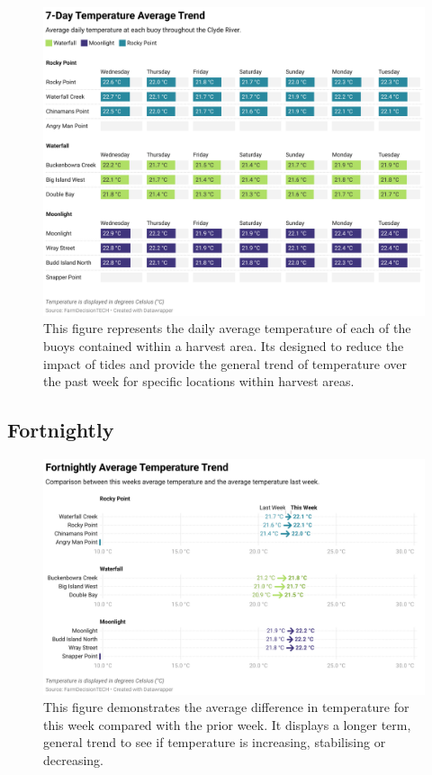 \documentclass[10pt]{article}
\begin{document}
\begin{figure}[H]
\centering
\includegraphics[width=\textwidth]{weekly-temperature.png}
\caption[Average Weekly Temperature Table]{This figure represents the daily average temperature of each of the buoys contained within a harvest area. Its designed to reduce the impact of tides and provide the general trend of temperature over the past week for specific locations within harvest areas.}
\end{figure}

\subsection{Fortnightly}

\begin{figure}[H]
\centering
\includegraphics[width=\textwidth]{fortnightly-temperature.png}
\caption[Average Fortnightly Temperature Difference]{This figure demonstrates the average difference in temperature for this week compared with the prior week. It displays a longer term, general trend to see if temperature is increasing, stabilising or decreasing.}
\end{figure}
\end{document}
